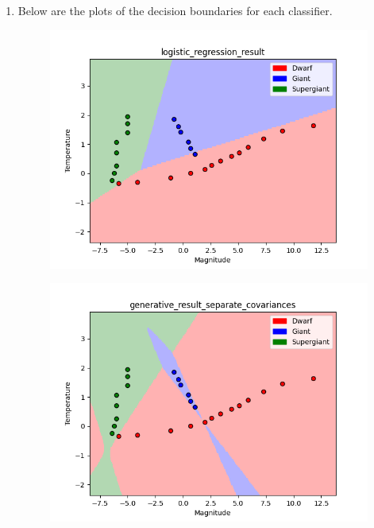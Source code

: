 \documentclass[submit]{harvardml}
\begin{document}
\begin{enumerate}

\item Below are the plots of the decision boundaries for each classifier.
\newpage
\begin{figure}[h]
\includegraphics[scale=0.8]{logistic_regression_result.png}
\centering
\end{figure}

\newpage
\begin{figure}[h]
\includegraphics[scale=0.8]{generative_result_separate_covariances.png}
\centering
\end{figure}



\end{enumerate}
\end{document}
